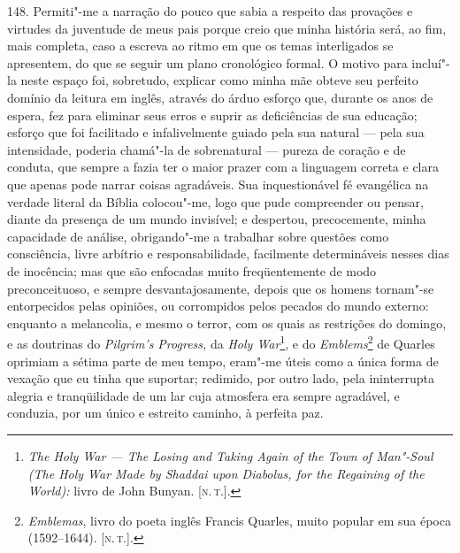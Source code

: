 148. Permiti"-me a narração do pouco que sabia a respeito das provações e
virtudes da juventude de meus pais porque creio que minha história será,
ao fim, mais completa, caso a escreva ao ritmo em que os temas
interligados se apresentem, do que se seguir um plano cronológico
formal. O motivo para incluí"-la neste espaço foi, sobretudo, explicar
como minha mãe obteve seu perfeito domínio da leitura em inglês, através
do árduo esforço que, durante os anos de espera, fez para eliminar seus
erros e suprir as deficiências de sua educação; esforço que foi
facilitado e infalivelmente guiado pela sua natural --- pela sua
intensidade, poderia chamá"-la de sobrenatural --- pureza de coração e de
conduta, que sempre a fazia ter o maior prazer com a linguagem correta e
clara que apenas pode narrar coisas agradáveis. Sua inquestionável fé
evangélica na verdade literal da Bíblia colocou"-me, logo que pude
compreender ou pensar, diante da presença de um mundo invisível; e
despertou, precocemente, minha capacidade de análise, obrigando"-me a
trabalhar sobre questões como consciência, livre arbítrio e
responsabilidade, facilmente determináveis nesses dias de inocência; mas
que são enfocadas muito freqüentemente de modo preconceituoso, e sempre
desvantajosamente, depois que os homens tornam"-se entorpecidos pelas
opiniões, ou corrompidos pelos pecados do mundo externo: enquanto a
melancolia, e mesmo o terror, com os quais as restrições do domingo, e
as doutrinas do \emph{Pilgrim's Progress,} da \emph{Holy War}\footnote{\emph{The
  Holy War --- The Losing and Taking Again of the Town of Man"-Soul (The
  Holy War Made by Shaddai upon Diabolus, for the Regaining of the
  World):} livro de John Bunyan. {[}\textsc{n.\,t.}{]}.}, e do
\emph{Emblems}\footnote{\emph{Emblemas}, livro do poeta inglês Francis
  Quarles, muito popular em sua época (1592--1644). {[}\textsc{n.\,t.}{]}.} de
Quarles oprimiam a sétima parte de meu tempo, eram"-me úteis como a única
forma de vexação que eu tinha que suportar; redimido, por outro lado,
pela ininterrupta alegria e tranqüilidade de um lar cuja atmosfera era
sempre agradável, e conduzia, por um único e estreito caminho, à
perfeita paz.


